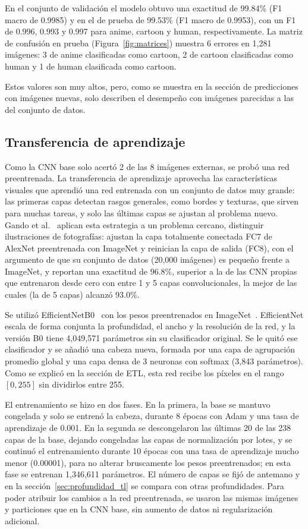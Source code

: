 \documentclass[letterpaper, 10 pt]{IEEEconf}
\begin{document}
En el conjunto de validación el modelo obtuvo una exactitud de 99.84\% (F1 macro de 0.9985) y en el de prueba de 99.53\% (F1 macro de 0.9953), con un F1 de 0.996, 0.993 y 0.997 para anime, cartoon y human, respectivamente. La matriz de confusión en prueba (Figura~\ref{fig:matrices}) muestra 6 errores en 1,281 imágenes: 3 de anime clasificadas como cartoon, 2 de cartoon clasificadas como human y 1 de human clasificada como cartoon.

Estos valores son muy altos, pero, como se muestra en la sección de predicciones con imágenes nuevas, solo describen el desempeño con imágenes parecidas a las del conjunto de datos.

\subsection{Transferencia de aprendizaje}

Como la CNN base solo acertó 2 de las 8 imágenes externas, se probó una red preentrenada. La transferencia de aprendizaje aprovecha las características visuales que aprendió una red entrenada con un conjunto de datos muy grande: las primeras capas detectan rasgos generales, como bordes y texturas, que sirven para muchas tareas, y solo las últimas capas se ajustan al problema nuevo. Gando et al.~\cite{gando} aplican esta estrategia a un problema cercano, distinguir ilustraciones de fotografías: ajustan la capa totalmente conectada FC7 de AlexNet preentrenada con ImageNet y reinician la capa de salida (FC8), con el argumento de que su conjunto de datos (20,000 imágenes) es pequeño frente a ImageNet, y reportan una exactitud de 96.8\%, superior a la de las CNN propias que entrenaron desde cero con entre 1 y 5 capas convolucionales, la mejor de las cuales (la de 5 capas) alcanzó 93.0\%.

Se utilizó EfficientNetB0~\cite{efficientnet} con los pesos preentrenados en ImageNet~\cite{imagenet}. EfficientNet escala de forma conjunta la profundidad, el ancho y la resolución de la red, y la versión B0 tiene 4,049,571 parámetros sin su clasificador original. Se le quitó ese clasificador y se añadió una cabeza nueva, formada por una capa de agrupación promedio global y una capa densa de 3 neuronas con softmax (3,843 parámetros). Como se explicó en la sección de ETL, esta red recibe los píxeles en el rango $[0,255]$ sin dividirlos entre 255.

El entrenamiento se hizo en dos fases. En la primera, la base se mantuvo congelada y solo se entrenó la cabeza, durante 8 épocas con Adam y una tasa de aprendizaje de 0.001. En la segunda se descongelaron las últimas 20 de las 238 capas de la base, dejando congeladas las capas de normalización por lotes, y se continuó el entrenamiento durante 10 épocas con una tasa de aprendizaje mucho menor (0.00001), para no alterar bruscamente los pesos preentrenados; en esta fase se entrenan 1,346,611 parámetros. El número de capas se fijó de antemano y en la sección~\ref{sec:profundidad_tl} se compara con otras profundidades. Para poder atribuir los cambios a la red preentrenada, se usaron las mismas imágenes y particiones que en la CNN base, sin aumento de datos ni regularización adicional.
\end{document}
